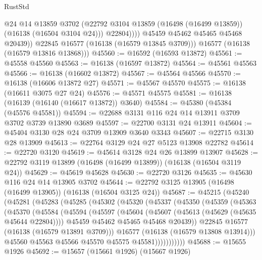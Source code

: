 \begin{lexlean}{RustStd}
\begin{coremodule}
                    @24
                    @14
                    @13859
                    @3702
                    (@22792 @3104 @13859 (@16498 (@16499 @13859)) (@16138 (@16504 @3104 @24)))
                    @22804))))
            @45459
            @45462
            @45465
            @45468
            @20439))
        @22845
        @16577
        (@16138 (@16579 @13845 @3709)))
      @16577
      (@16138 (@16579 @13816 @13868)))
@45560 := @16592 (@16593 @13872)
@45561 := @45558 @45560
@45563 := @16138 (@16597 @13872)
@45564 := @45561 @45563
@45566 := @16138 (@16602 @13872)
@45567 := @45564 @45566
@45570 := @16138 (@16606 @13872 @27)
@45571 := @45567 @45570
@45575 := @16138 (@16611 @3075 @27 @24)
@45576 := @45571 @45575
@45581 := @16138 (@16139 (@16140 (@16617 @13872)) @3640)
@45584 := @45380 (@45384 (@45576 @45581))
@45594 := @22688 @3131 @116 @24 @14 @13911 @3709 @3702 @3739 @13890 @3689
@45597 := @22700 @3131 @24 @13911
@45604 := @45404 @3130 @28 @24 @3709 @13909 @3640 @3343
@45607 := @22715 @3130 @28 @13909
@45613 := @22764 @3129 @24 @27 @5123 @13908 @22782
@45614 := @22720 @3120
@45619 := @45614 @3128 @24 @26 @13899 @13907
@45628 := @22792 @3119 @13899 (@16498 (@16499 @13899)) (@16138 (@16504 @3119 @24))
@45629 := @45619 @45628
@45630 := @22720 @3126
@45635 := @45630 @116 @24 @14 @13905 @3702
@45644 := @22792 @3125 @13905 (@16498 (@16499 @13905)) (@16138 (@16504 @3125 @24))
@45687 := @45215
    (@45240
      (@45281
        (@45283
          (@45285
            (@45302
              (@45320
                (@45337
                  (@45350
                    (@45359
                      (@45363
                        (@45370
                          (@45584
                            (@45594
                              (@45597
                                (@45604
                                  (@45607 (@45613 (@45629 (@45635 @45644 @22804))))
                                  @45459
                                  @45462
                                  @45465
                                  @45468
                                  @20439))
                              @22845
                              @16577
                              (@16138 (@16579 @13891 @3709)))
                            @16577
                            (@16138 (@16579 @13808 @13914)))
                          @45560
                          @45563
                          @45566
                          @45570
                          @45575
                          @45581)))))))))))
@45688 := @15655 @1926
@45692 := @15657 (@15661 @1926) (@15667 @1926)

\end{coremodule}
\end{lexlean}
